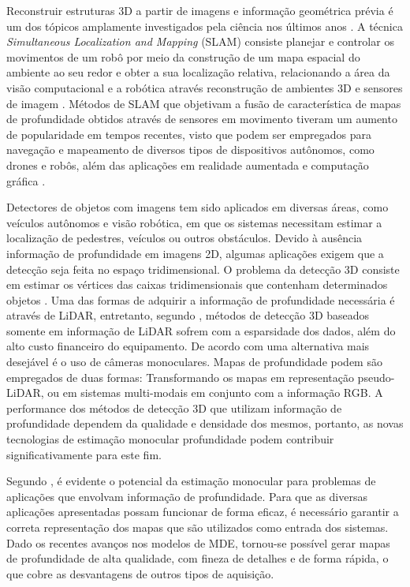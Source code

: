 Reconstruir estruturas 3D a partir de imagens e informação geométrica prévia é um dos tópicos amplamente investigados pela ciência nos últimos anos \cite{zhao2020monocular}. A técnica \textit{Simultaneous Localization and Mapping} (SLAM) consiste planejar e controlar os movimentos de um robô por meio da construção de um mapa espacial do ambiente ao seu redor e obter a sua localização relativa, relacionando a área da visão computacional e a robótica através reconstrução de ambientes 3D e sensores de imagem \cite{placed2023survey} \cite{stachniss2016simultaneous}. Métodos de SLAM que objetivam a fusão de característica de mapas de profundidade obtidos através de sensores em movimento tiveram um aumento de popularidade em tempos recentes, visto que podem ser empregados para navegação e mapeamento de diversos tipos de dispositivos autônomos, como drones e robôs, além das aplicações em realidade aumentada e computação gráfica \cite{tateno2017cnn}.


Detectores de objetos com imagens tem sido aplicados em diversas áreas, como veículos autônomos e visão robótica, em que os sistemas necessitam estimar a localização de pedestres, veículos ou outros obstáculos. Devido à ausência informação de profundidade em imagens 2D, algumas aplicações exigem que a detecção seja feita no espaço tridimensional. O problema da detecção 3D consiste em estimar os vértices das caixas tridimensionais que contenham determinados objetos \cite{hu2022detection}. Uma das formas de adquirir a informação de profundidade necessária é através de LiDAR, entretanto, segundo , métodos de detecção 3D baseados somente em informação de LiDAR sofrem com a esparsidade dos dados, além do alto custo financeiro do equipamento. De acordo com  uma alternativa mais desejável é o uso de câmeras monoculares. Mapas de profundidade podem são empregados de duas formas: Transformando os mapas em representação pseudo-LiDAR, ou em sistemas multi-modais em conjunto com a informação RGB. A performance dos métodos de detecção 3D que utilizam informação de profundidade dependem da qualidade e densidade dos mesmos, portanto, as novas tecnologias de estimação monocular profundidade podem contribuir significativamente para este fim.






Segundo , é evidente o potencial da estimação monocular para problemas de aplicações que envolvam informação de profundidade. Para que as diversas aplicações apresentadas possam funcionar de forma eficaz, é necessário garantir a correta representação dos mapas que são utilizados como entrada dos sistemas. Dado os recentes avanços nos modelos de MDE, tornou-se possível gerar mapas de profundidade de alta qualidade, com fineza de detalhes e de forma rápida, o que cobre as desvantagens de outros tipos de aquisição. 


